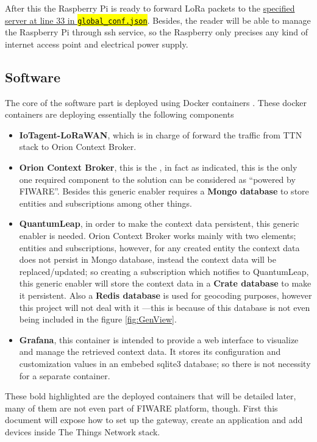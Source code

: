 \documentclass[11pt,a4paper,dvipsnames,twoside]{article}
\newcommand{\myuline}[1]{%
  \uline{\phantom{#1}}%
  \llap{\contour{white}{#1}}%
}
\newcommand{\cmd}[1] {\hl{\texttt{#1}}}
\begin{document}
After this the Raspberry Pi is ready to forward LoRa packets to the \href{https://github.com/dragino/dual_chan_pkt_fwd/blob/master/global_conf.json#L33}{specified server at line 33 in \cmd{global\_conf.json}}. Besides, the reader will be able to manage the Raspberry Pi through ssh service, so the Raspberry only precises any kind of internet access point and electrical power supply.

\subsection{Software}

The core of the software part is deployed using Docker containers \cite{Docker_container}. These docker containers are deploying essentially the following components

\begin{itemize}
  \item \textbf{IoTagent-LoRaWAN}, which is in charge of forward the traffic from TTN stack to Orion Context Broker.
  \item \textbf{Orion Context Broker}, this is the \myuline{core generic enabler}, in fact as indicated, this is the only one required component to the solution can be considered as \enquote{powered by FIWARE}. Besides this generic enabler requires a \textbf{Mongo database} to store entities and subscriptions among other things. 
  \item \textbf{QuantumLeap}, in order to make the context data persistent, this generic enabler is needed. Orion Context Broker works mainly with two elements; entities and subscriptions, however, for any created entity the context data does not persist in Mongo database, instead the context data will be replaced/updated; so creating a subscription which notifies to QuantumLeap, this generic enabler will store the context data in a \textbf{Crate database} to make it persistent. Also a \textbf{Redis database} is used for geocoding purposes, however this project will not deal with it ---this is because of this database is not even being included in the figure \ref{fig:GenView}.
  \item \textbf{Grafana}, this container is intended to provide a web interface to visualize and manage the retrieved context data. It stores its configuration and customization values in an embebed sqlite3 database; so there is not necessity for a separate container. 
\end{itemize}

These bold highlighted are the deployed containers that will be detailed later, many of them are not even part of FIWARE platform, though. First this document will expose how to set up the gateway, create an application and add devices inside The Things Network stack. 
\end{document}
